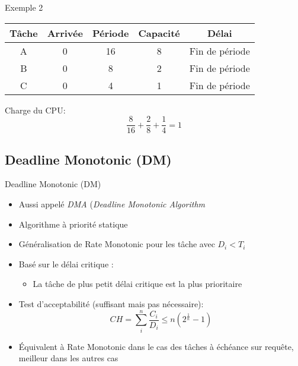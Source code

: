\begin{frame}{Exemple 2}
  \begin{center}
    \begin{tabular}{ccccc}
      \hline
      Tâche & Arrivée & Période & Capacité & Délai \\
      \hline
      A & 0 & 16 & 8 & Fin de période\\
      B & 0 &  8 & 2 & Fin de période\\
      C & 0 &  4 & 1 & Fin de période\\
      \hline
    \end{tabular}
  \end{center}

  \pause
  Charge du CPU:
  $$\frac{8}{16} + \frac{2}{8} + \frac{1}{4} = 1$$

  \pause
  \begin{center}
    
  \end{center}
\end{frame}

\subsection{Deadline Monotonic (DM)}

\begin{frame}{Deadline Monotonic (DM)}
  \begin{itemize}
  \item Aussi appelé \emph{DMA} (\emph{Deadline Monotonic Algorithm}
  \item Algorithme à priorité statique
  \item Généralisation de Rate Monotonic pour les tâche avec $D_i < T_i$
  \item Basé sur le délai critique :
    \begin{itemize}
    \item La tâche de plus petit délai critique est la plus prioritaire
    \end{itemize}
  \item Test d'acceptabilité (suffisant mais pas nécessaire):
    $$CH = \sum_i^n \frac{C_i}{D_i} ≤ n \left(2^{\frac{1}{n}}-1\right)$$
  \item Équivalent à Rate Monotonic  dans le cas des tâches à échéance
    sur requête, meilleur dans les autres cas
  \end{itemize}
\end{frame}

